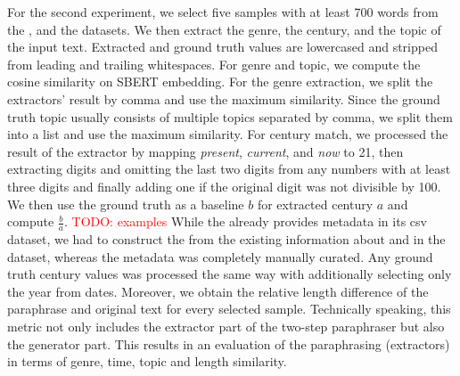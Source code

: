 For the second experiment, we select five samples with at least 700 words from the \dataBlog{}, \dataGutenberg{} and the \dataStudent{} datasets. 
We then extract the genre, the century, and the topic of the input text.
Extracted and ground truth values are lowercased and stripped from leading and trailing whitespaces. 
For genre and topic, we compute the cosine similarity on SBERT embedding.
For the genre extraction, we split the extractors' result by comma and use the maximum similarity.
Since the ground truth topic usually consists of multiple topics separated by comma, we split them into a list and use the maximum similarity.
For century match, we processed the result of the extractor by mapping \textit{present}, \textit{current}, and \textit{now} to 21, then extracting digits and omitting the last two digits from any numbers with at least three digits and finally adding one if the original digit was not divisible by 100.
We then use the ground truth as a baseline $b$ for extracted century $a$ and compute $\frac{b}{a}$.
\textcolor{red}{TODO: examples}
While the \dataBlog{} already provides metadata in its csv dataset, we had to construct the \dataStudent{} from the existing information about and in the dataset, whereas the \dataGutenberg{} metadata was completely manually curated.
Any ground truth century values was processed the same way with additionally selecting only the year from dates.
Moreover, we obtain the relative length difference of the paraphrase and original text for every selected sample. 
Technically speaking, this metric not only includes the extractor part of the two-step paraphraser but also the generator part.
This results in an evaluation of the paraphrasing (extractors) in terms of genre, time, topic and length similarity.